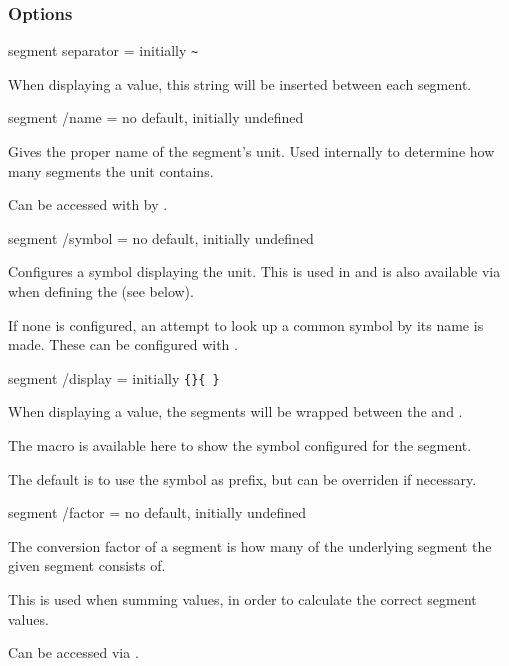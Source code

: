 \documentclass{article}
\begin{document}
\subsubsection{Options}

\begin{docKey}
	{segment separator}
	{=}
	{initially \texttt{\~{}}}
	
	When displaying a value, this string will be inserted between each segment.
\end{docKey}

\begin{docKey}
	[]
	[doc label=segment:name]
	{segment /name}
	{=}
	{no default, initially undefined}

	Gives the proper name of the segment's unit. Used internally to determine how many segments the unit contains.
	
	Can be accessed with by .
\end{docKey}

\begin{docKey}
	[]
	[doc label=segment:symbol]
	{segment /symbol}
	{=}
	{no default, initially undefined}

	Configures a symbol displaying the unit. This is used in  and is also available via  when defining the  (see below).
	
	If none is configured, an attempt to look up a common symbol by its name is made. These can be configured with .
\end{docKey}

\begin{docKey}
	[]
	[doc label=segment:display]
	{segment /display}
	{=}
	{initially \texttt{\{\}\{ \}}}

	When displaying a value, the segments will be wrapped between the  and .
	
	The macro  is available here to show the symbol configured for the segment.
	
	The default is to use the symbol as prefix, but can be overriden if necessary.
\end{docKey}

\begin{docKey}
	[]
	[doc label=segment:factor]
	{segment /factor}
	{=}
	{no default, initially undefined}
	
	The conversion factor of a segment is how many of the underlying segment the given segment consists of.
	
	This is used when summing values, in order to calculate the correct segment values.
	
	Can be accessed via .
\end{docKey}
\end{document}
